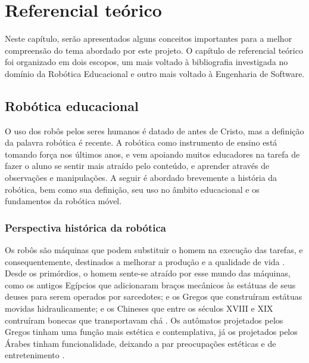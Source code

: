 \chapter{Referencial teórico}
Neste capítulo, serão apresentados alguns conceitos importantes para a melhor compreensão do tema abordado por este projeto. O capítulo de referencial teórico foi organizado em dois escopos, um mais voltado à bibliografia investigada no domínio da Robótica Educacional e outro mais voltado à Engenharia de Software.
\section{Robótica educacional}
O uso dos robôs pelos seres humanos é datado de antes de Cristo, mas a definição da palavra robótica é recente. A robótica como instrumento de ensino está tomando força nos últimos anos, e vem apoiando muitos educadores na tarefa de fazer o aluno se sentir mais atraído pelo conteúdo, e aprender através de observações e manipulações. A seguir é abordado brevemente a história da robótica, bem como sua definição, seu uso no âmbito educacional e os fundamentos da robótica móvel. 
\subsection{Perspectiva histórica da robótica}
Os robôs são máquinas que podem substituir o homem na execução das tarefas, e consequentemente, destinados a melhorar a produção e a qualidade de vida . Desde os primórdios, o homem sente-se  atraído por esse mundo das máquinas, como os antigos Egípcios que adicionaram braços mecânicos às estátuas de seus deuses para serem operados por sarcedotes; e os Gregos que construíram estátuas movidas hidraulicamente; e os Chineses que entre os séculos XVIII e XIX contruíram bonecas que transportavam chá \cite{santos2002robotica}.
Os autômatos projetados pelos Gregos tinham uma função mais estética e contemplativa, já os projetados pelos Árabes tinham funcionalidade, deixando a par preocupações estéticas e de entretenimento \cite{santos2002robotica}.


